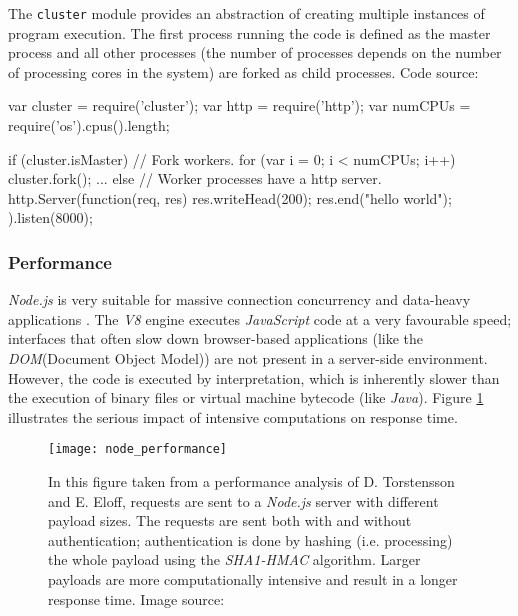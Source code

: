 \begin{program}
  \caption{The \texttt{cluster} module provides an abstraction of creating multiple instances of program execution. The first process running the code is defined as the master process and all other processes (the number of processes depends on the number of processing cores in the system) are forked as child processes. Code source: \cite{Hughes-Croucher2012}}
  \label{prog:cluster}
  \begin{JavaCode}
var cluster = require('cluster'); 
var http = require('http');
var numCPUs = require('os').cpus().length;

if (cluster.isMaster) {
    // Fork workers.
    for (var i = 0; i < numCPUs; i++) {
        cluster.fork();
    }
    ...
} else {
    // Worker processes have a http server.
    http.Server(function(req, res) {
        res.writeHead(200);
        res.end("hello world\n");
    }).listen(8000);
}
  \end{JavaCode}
\end{program}

\subsubsection*{Performance}
\textit{Node.js} is very suitable for massive connection concurrency and data-heavy applications \cite[p. 44]{Torstensson2012}. The \textit{V8} engine executes \textit{JavaScript} code at a very favourable speed; interfaces that often slow down browser-based applications (like the \textit{DOM}(Document Object Model)) are not present in a server-side environment. However, the code is executed by interpretation, which is inherently slower than the execution of binary files or virtual machine bytecode (like \textit{Java}). Figure \ref{fig:node_performance} illustrates the serious impact of intensive computations on response time. 

\begin{figure}
\centering\small
\setlength{\tabcolsep}{0mm}
  \texttt{[image: node\_performance]}
\caption{
In this figure taken from a performance analysis of D. Torstensson and E. Eloff, requests are sent to a \textit{Node.js} server with different payload sizes. The requests are sent both with and without authentication; authentication is done by hashing (i.e. processing) the whole payload using the \textit{SHA1-HMAC} algorithm. Larger payloads are more computationally intensive and result in a longer response time. Image source: \cite{Torstensson2012}
}
\label{fig:node_performance}
\end{figure}

